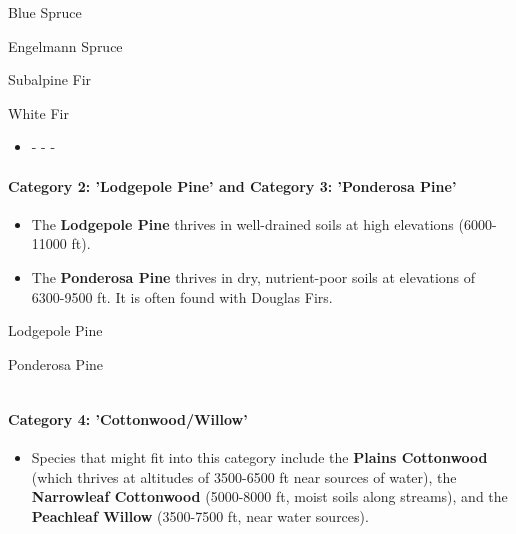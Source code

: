 \documentclass[11pt]{article}
\providecommand{\tightlist}{%
      \setlength{\itemsep}{0pt}\setlength{\parskip}{0pt}}
\begin{document}
Blue Spruce

\textbar{}

Engelmann Spruce

\textbar{}

Subalpine Fir

\textbar{}

White Fir

\begin{itemize}
\tightlist
\item
  \textbar{} - \textbar{} - \textbar{} - \textbar{} \textbar{}
  \textbar{} 
\end{itemize}

    \paragraph{\texorpdfstring{{Category 2}: 'Lodgepole Pine' and {Category
3}: 'Ponderosa
Pine'}{Category 2: 'Lodgepole Pine' and Category 3: 'Ponderosa Pine'}}\label{category-2-lodgepole-pine-and-category-3-ponderosa-pine}

\begin{itemize}
\tightlist
\item
  The \textbf{Lodgepole Pine} thrives in well-drained soils at high
  elevations (6000-11000 ft).
\item
  The \textbf{Ponderosa Pine} thrives in dry, nutrient-poor soils at
  elevations of 6300-9500 ft. It is often found with Douglas Firs.
\end{itemize}

Lodgepole Pine

\textbar{}

Ponderosa Pine

\begin{longtable}[]{@{}ll@{}}
\toprule
&\tabularnewline
\bottomrule
\end{longtable}

    \paragraph{\texorpdfstring{{Category 4}:
'Cottonwood/Willow'}{Category 4: 'Cottonwood/Willow'}}\label{category-4-cottonwoodwillow}

\begin{itemize}
\tightlist
\item
  Species that might fit into this category include the \textbf{Plains
  Cottonwood} (which thrives at altitudes of 3500-6500 ft near sources
  of water), the \textbf{Narrowleaf Cottonwood} (5000-8000 ft, moist
  soils along streams), and the \textbf{Peachleaf Willow} (3500-7500 ft,
  near water sources).
\end{itemize}
\end{document}
